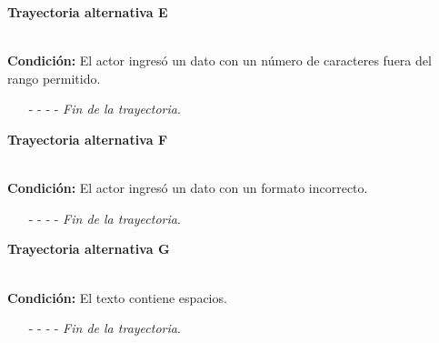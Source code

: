 \hypertarget{CU12-1-1-1-1-1:TAE}{\textbf{Trayectoria alternativa E}}\\
\noindent \textbf{Condición:} El actor ingresó un dato con un número de caracteres fuera del rango permitido.
\begin{enumerate}
	\UCpaso[\UCsist] Muestra el mensaje  señalando el campo que presenta el error en la pantalla .
	\UCpaso Regresa al paso \ref{CU12.1.1.1.1.1-P5} de la trayectoria principal.
	\item[- -] - - {\em {Fin de la trayectoria}}.%
\end{enumerate}
\hypertarget{CU12-1-1-1-1-1:TAF}{\textbf{Trayectoria alternativa F}}\\
\noindent \textbf{Condición:} El actor ingresó un dato con un formato incorrecto.
\begin{enumerate}
	\UCpaso[\UCsist] Muestra el mensaje  señalando el campo que presenta el error en la pantalla .
	\UCpaso Regresa al paso \ref{CU12.1.1.1.1.1-P5} de la trayectoria principal.
	\item[- -] - - {\em {Fin de la trayectoria}}.
\end{enumerate}
\hypertarget{CU12-1-1-1-1-1:TAG}{\textbf{Trayectoria alternativa G}}\\
\noindent \textbf{Condición:} El texto contiene espacios.
\begin{enumerate}
	\UCpaso[\UCsist] Sustituye los espacios por guiones bajos.
	\UCpaso Continua en el \ref{CU12.1.1.1.1.1-TA1} de la trayectoria alternativa A.
	\item[- -] - - {\em {Fin de la trayectoria}}.
\end{enumerate}